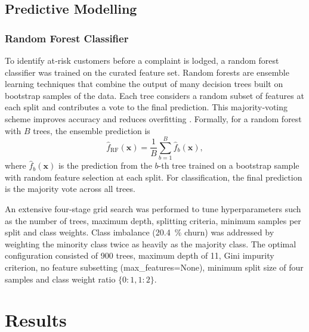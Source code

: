 \documentclass[12pt]{article}
\begin{document}
\subsection{Predictive Modelling}
\subsubsection{Random Forest Classifier}
To identify at‑risk customers before a complaint is lodged, a random forest classifier was trained on the curated feature set.  Random forests are ensemble learning techniques that combine the output of many decision trees built on bootstrap samples of the data.  Each tree considers a random subset of features at each split and contributes a vote to the final prediction.  This majority‑voting scheme improves accuracy and reduces overfitting \citep{geeksforgeeks_randomforest}.  Formally, for a random forest with \(B\) trees, the ensemble prediction is
\[ \hat{f}_{\text{RF}}(\mathbf{x}) = \frac{1}{B} \sum_{b=1}^{B} \hat{f}_b(\mathbf{x}), \]
where \(\hat{f}_b(\mathbf{x})\) is the prediction from the \(b\)-th tree trained on a bootstrap sample with random feature selection at each split.  For classification, the final prediction is the majority vote across all trees.

An extensive four‑stage grid search was performed to tune hyperparameters such as the number of trees, maximum depth, splitting criteria, minimum samples per split and class weights.  Class imbalance (20.4~\% churn) was addressed by weighting the minority class twice as heavily as the majority class.  The optimal configuration consisted of 900 trees, maximum depth of 11, Gini impurity criterion, no feature subsetting (max\_features=None), minimum split size of four samples and class weight ratio \(\{0:1,1:2\}\).

\section{Results}
\end{document}
